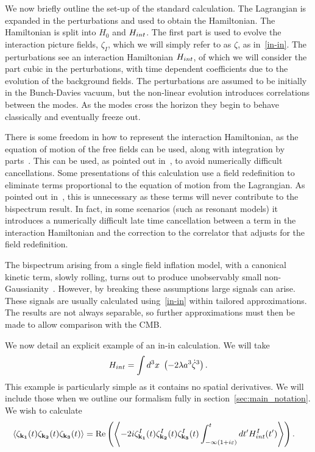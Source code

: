 We now briefly outline the set-up of the standard calculation.
The Lagrangian is expanded in the perturbations and used to obtain the Hamiltonian.
The Hamiltonian is split into $H_0$ and $H_{int}$.
The first part is used to evolve the interaction picture fields, $\zeta_I$,
which we will simply refer to as $\zeta$, as in~\eqref{in-in}.
The perturbations see an interaction Hamiltonian $H_{int}$,
of which we will consider the part cubic in the perturbations,
with time dependent coefficients due to the evolution of the background fields.
The perturbations are assumed to be initially in the Bunch-Davies vacuum,
but the non-linear
evolution introduces correlations between the modes.
As the modes cross the horizon they begin to behave classically
and eventually freeze out.


There is some freedom in how to represent the interaction Hamiltonian,
as the equation of motion of the free fields can be used, along with integration by parts~\cite{rp_integ_by_parts}.
This can be used, as pointed out in~\cite{Funakoshi}, to avoid numerically difficult cancellations.
Some presentations of this calculation use a field redefinition to eliminate terms
proportional to the equation of motion from the Lagrangian.
As pointed out in~\cite{px_burrage},
this is unnecessary as these terms will never contribute to the bispectrum result.
In fact, in some scenarios (such as resonant models) it introduces a numerically difficult
late time cancellation between a term in the interaction Hamiltonian and the
correction to the correlator that adjusts for the field redefinition.


The bispectrum arising from a single field inflation model,
with a canonical kinetic term, slowly rolling, turns out to produce
unobservably small non-Gaussianity~\cite{Maldacena}.
However, by breaking these assumptions large signals can arise.
These signals are usually calculated using~\eqref{in-in} within tailored approximations.
The results are not always separable, so further approximations must then be made to
allow comparison with the CMB.


We now detail an explicit example of an in-in calculation.
We will take
\begin{align}\label{hint_example}
    H_{int}=\int d^3x~\left(-2\lambda a^3\dot{\zeta}^3\right).
\end{align}
This example is particularly simple as it contains no spatial derivatives.
We will include those when we outline our formalism fully in section~\ref{sec:main_notation}.
We wish to calculate
\begin{align}\label{inin_example}
    \left<\zeta_{\mathbf{k_1}}(t)\zeta_{\mathbf{k_2}}(t)\zeta_{\mathbf{k_3}}(t)\right>&=
    \operatorname{Re}\left(\left<-2i \zeta^I_{\mathbf{k_1}}(t)\zeta^I_{\mathbf{k_2}}(t)\zeta^I_{\mathbf{k_3}}(t)
    \int_{-\infty(1+i\varepsilon)}^{t}dt'H_{int}^I(t')
    \right>\right).
\end{align}

